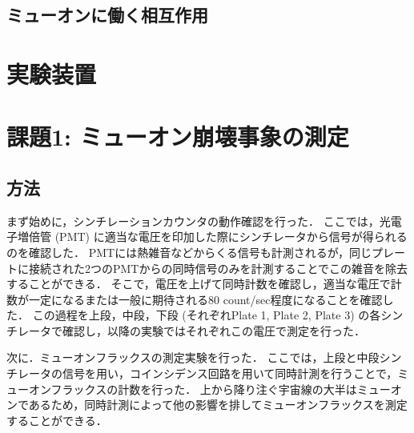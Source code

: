 \documentclass[uplatex,dvipdfmx,a4j,12pt]{jsarticle}
\begin{document}
\subsection{ミューオンに働く相互作用}


\section{実験装置}

\section{課題1: ミューオン崩壊事象の測定}
\subsection{方法}
まず始めに，シンチレーションカウンタの動作確認を行った．
ここでは，光電子増倍管 (PMT) に適当な電圧を印加した際にシンチレータから信号が得られるのを確認した．
PMTには熱雑音などからくる信号も計測されるが，同じプレートに接続された2つのPMTからの同時信号のみを計測することでこの雑音を除去することができる．
そこで，電圧を上げて同時計数を確認し，適当な電圧で計数が一定になるまたは一般に期待される80 count/sec程度になることを確認した．
この過程を上段，中段，下段 (それぞれPlate 1, Plate 2, Plate 3) の各シンチレータで確認し，以降の実験ではそれぞれこの電圧で測定を行った．

次に．ミューオンフラックスの測定実験を行った．
ここでは，上段と中段シンチレータの信号を用い，コインシデンス回路を用いて同時計測を行うことで，ミューオンフラックスの計数を行った．
上から降り注ぐ宇宙線の大半はミューオンであるため，同時計測によって他の影響を排してミューオンフラックスを測定することができる．
\end{document}
